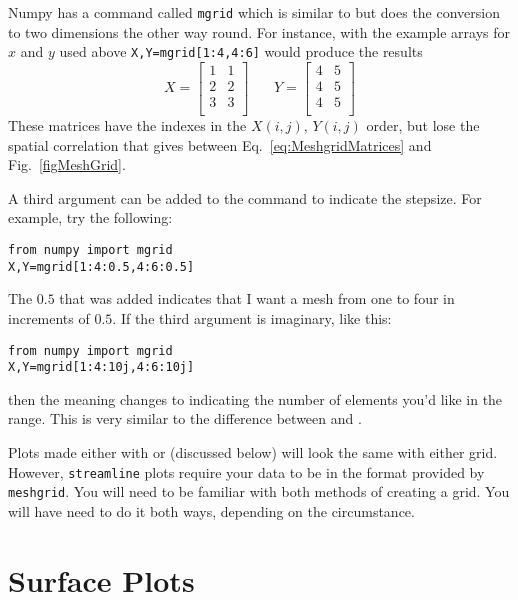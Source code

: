 Numpy has a command called {\tt mgrid} which is similar to
 but does the conversion to two dimensions the other
way round. For instance, with the example arrays for $x$ and $y$ used
above {\tt X,Y=mgrid[1:4,4:6]} would produce the results
\begin{equation}
X = \left[ \begin{array}{ll}
1 & 1 \\
2 & 2 \\
3 & 3 \\
\end{array}
\right]~~~~~~~~ Y = \left[ \begin{array}{ll}
4 & 5 \\
4 & 5 \\
4 & 5 \\
\end{array}
\right]
\end{equation}
These matrices have the indexes in the $X(i,j)$, $Y(i,j)$ order,
but lose the spatial correlation that  gives
between Eq.~\eqref{eq:MeshgridMatrices} and Fig.~\ref{figMeshGrid}.

A third argument can be added to the  command to indicate
the stepsize.  For example, try the following:
\begin{Verbatim}
from numpy import mgrid
X,Y=mgrid[1:4:0.5,4:6:0.5]
\end{Verbatim}
The $0.5$ that was added indicates that I want a mesh from one to four
in increments of $0.5$.  If the third argument is imaginary, like
this:
\begin{Verbatim}
from numpy import mgrid
X,Y=mgrid[1:4:10j,4:6:10j]
\end{Verbatim}
then the meaning changes to indicating the number of elements you'd
like in the range.  This is very similar to the difference between
 and .


Plots made either with  or  (discussed below) will look
the same with either grid.  However, {\tt streamline} plots require your
data to be in the format provided by {\tt meshgrid}.  You will need to be
familiar with both methods of creating a grid. You will have need to do
it both ways, depending on the circumstance.



\section{Surface Plots}
 


